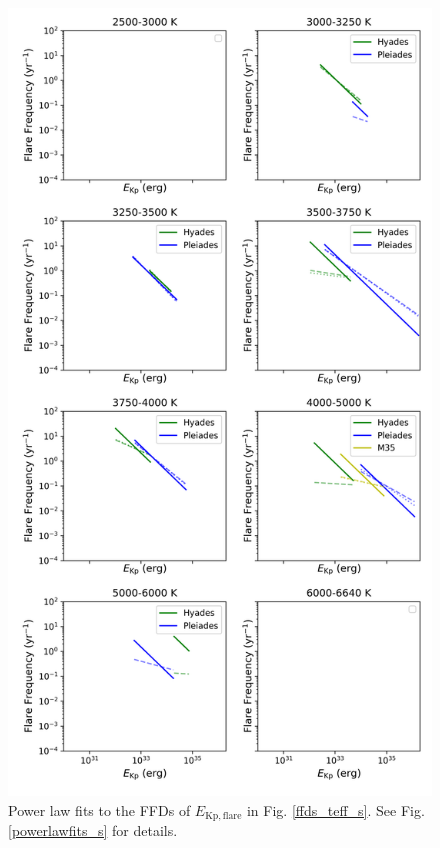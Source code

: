 \documentclass{aa}
\begin{document}
    \begin{figure}
    \centering
            \includegraphics[width=13cm]{pics/FFDs/powerlawfits_erg_2019_03_22_15.png}
         \caption{Power law fits to the FFDs of $E_\mathrm{Kp,flare}$ in Fig. \ref{ffds_teff_s}. See Fig. \ref{powerlawfits_s} for details.}
         \label{powerlawfits_erg}
   \end{figure}
\end{document}
